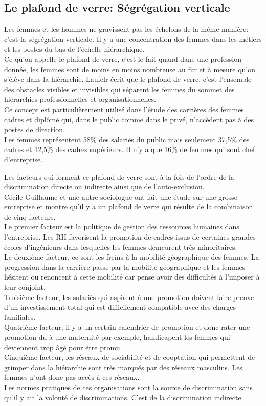 \documentclass[10pt, a4paper, openany]{book}
\begin{document}
\subsection{Le plafond de verre: Ségrégation verticale}

Les femmes et les hommes ne gravissent pas les échelons de la même manière: c'est la ségrégation verticale. Il y a une concentration des femmes dans les métiers et les postes du bas de l'échelle hiérarchique. \\
Ce qu'on appelle le plafond de verre, c'est le fait quand dans une profession donnée, les femmes sont de moins en moins nombreuse au fur et à mesure qu'on s'élève dans la hiérarchie. Laufelr écrit que le plafond de verre, c'est l'ensemble des obstacles visibles et invisibles qui séparent les femmes du sommet des hiérarchies professionnelles et organisationnelles. \\
Ce concept est particulièrement utilisé dans l'étude des carrières des femmes cadres et diplômé qui, dans le public comme dans le privé, n'accèdent pas à des postes de direction. \\
Les femmes représentent 58\% des salariés du public mais seulement 37,5\% des cadres et 12,5\% des cadres supérieurs. Il n'y a que 16\% de femmes qui sont chef d'entreprise. 


Les facteurs qui forment ce plafond de verre sont à la fois de l'ordre de la discrimination directe ou indirecte ainsi que de l'auto-exclusion. \\
Cécile Guillaume et une autre sociologue ont fait une étude sur une grosse entreprise et montre qu'il y a un plafond de verre qui résulte de la combinaison de cinq facteurs. \\
Le premier facteur est la politique de gestion des ressources humaines dans l'entreprise. Les RH favorisent la promotion de cadres issus de certaines grandes écoles d'ingénieurs dans lesquelles les femmes demeurent très minoritaires. \\
Le deuxième facteur, ce sont les freins à la mobilité géographique des femmes. La progression dans la carrière passe par la mobilité géographique et les femmes hésitent ou renoncent à cette mobilité car pense avoir des difficultés à l'imposer à leur conjoint. \\
Troisième facteur, les salariés qui aspirent à une promotion doivent faire preuve d'un investissement total qui est difficilement compatible avec des charges familiales. \\
Quatrième facteur, il y a un certain calendrier de promotion et donc rater une promotion du à une maternité par exemple, handicapent les femmes qui deviennent trop âgé pour être promu. \\
Cinquième facteur, les réseaux de sociabilité et de cooptation qui permettent de grimper dans la hiérarchie sont très marqués par des réseaux masculins. Les femmes n'ont donc pas accès à ces réseaux. \\
Les normes pratiques de ces organisations sont la source de discrimination sans qu'il y ait la volonté de discriminations. C'est de la discrimination indirecte. 
\end{document}

